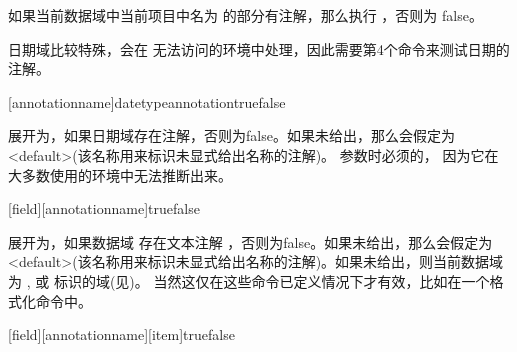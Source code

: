\begin{ltxsyntax}
如果当前数据域中当前项目中名为  的部分有注解，那么执行 ，否则为 false。


日期域比较特殊，会在 无法访问的环境中处理，因此需要第4个命令来测试日期的注解。

[annotationname]{datetype}{annotation}{true}{false}


展开为，如果日期域存在注解，否则为false。如果未给出，那么会假定为<default>(该名称用来标识未显式给出名称的注解)。 参数时必须的，
因为它在大多数使用的环境中无法推断出来。

[field][annotationname]{true}{false}


展开为，如果数据域  存在文本注解 ，否则为false。如果未给出，那么会假定为<default>(该名称用来标识未显式给出名称的注解)。如果未给出，则当前数据域为 ,  或 标识的域(见)。 当然这仅在这些命令已定义情况下才有效，比如在一个格式化命令中。

[field][annotationname][item]{true}{false}



\end{ltxsyntax}
